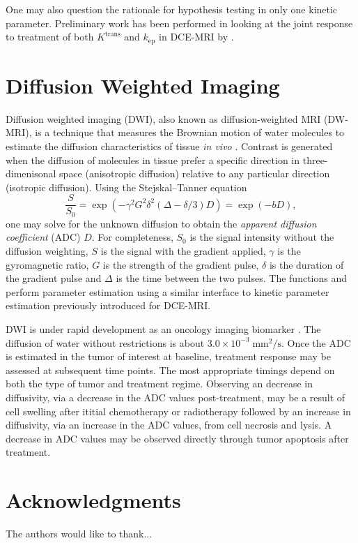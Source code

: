 \documentclass[article]{jss}
\newcommand{\ktrans}{K^\text{trans}}
\newcommand{\kep}{k_\text{ep}}
\begin{document}
One may also question the rationale for hypothesis testing in only one
kinetic parameter.  Preliminary work has been performed in looking at
the joint response to treatment of both $\ktrans$ and $\kep$ in
DCE-MRI by \cite{oco-etal:fPCA}.

\section[Diffusion Weighted Imaging]{Diffusion Weighted Imaging}

Diffusion weighted imaging (DWI), also known as diffusion-weighted MRI
(DW-MRI), is a technique that measures the Brownian motion of water
molecules to estimate the diffusion characteristics of tissue \emph{in
vivo} \citep{mos-etal:diffusion,bux:introduction}.  Contrast is
generated when the diffusion of molecules in tissue prefer a specific
direction in three-dimenisonal space (anisotropic diffusion) relative
to any particular direction (isotropic diffusion).  Using the
Stejskal--Tanner equation
\begin{equation*}
  \frac{S}{S_0} =
  \exp\left(-\gamma^2G^2\delta^2(\Delta-\delta/3)D\right) =
  \exp\left(-bD\right),
\end{equation*}
one may solve for the unknown diffusion to obtain the \emph{apparent
diffusion coefficient} (ADC) $D$.  For completeness, $S_0$ is the
signal intensity without the diffusion weighting, $S$ is the signal
with the gradient applied, $\gamma$ is the gyromagnetic ratio, $G$ is
the strength of the gradient pulse, $\delta$ is the duration of the
gradient pulse and $\Delta$ is the time between the two pulses.  The
functions  and  perform parameter
estimation using a similar interface to kinetic parameter estimation
previously introduced for DCE-MRI.

DWI is under rapid development as an oncology imaging biomarker
\citep{che-etal:diffusion,koh-col:DW-MRI}.  The diffusion of water
without restrictions is about
$3.0{\times}10^{-3}\;\text{mm}^2/\text{s}$.  Once the ADC is estimated
in the tumor of interest at baseline, treatment response may be
assessed at subsequent time points.  The most appropriate timings
depend on both the type of tumor and treatment regime.  Observing an
decrease in diffusivity, via a decrease in the ADC values
post-treatment, may be a result of cell swelling after ititial
chemotherapy or radiotherapy followed by an increase in diffusivity,
via an increase in the ADC values, from cell necrosis and lysis.  A
decrease in ADC values may be observed directly through tumor
apoptosis after treatment.  

\section*{Acknowledgments}

The authors would like to thank...


\end{document}

